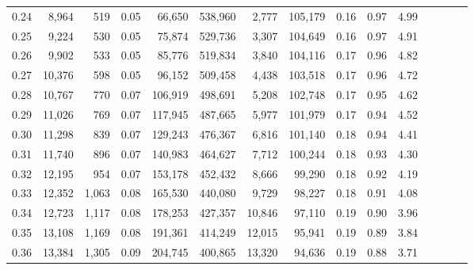\begin{tabular}{rrrcrrrrrrrrrrr}
0.24 &   8,964 &    519 &                                       0.05 &   66,650 &  538,960 &    2,777 &  105,179 &  0.16 &  0.97 &                         4.99 \\
0.25 &   9,224 &    530 &                                       0.05 &   75,874 &  529,736 &    3,307 &  104,649 &  0.16 &  0.97 &                         4.91 \\
0.26 &   9,902 &    533 &                                       0.05 &   85,776 &  519,834 &    3,840 &  104,116 &  0.17 &  0.96 &                         4.82 \\
0.27 &  10,376 &    598 &                                       0.05 &   96,152 &  509,458 &    4,438 &  103,518 &  0.17 &  0.96 &                         4.72 \\
0.28 &  10,767 &    770 &                                       0.07 &  106,919 &  498,691 &    5,208 &  102,748 &  0.17 &  0.95 &                         4.62 \\
0.29 &  11,026 &    769 &                                       0.07 &  117,945 &  487,665 &    5,977 &  101,979 &  0.17 &  0.94 &                         4.52 \\
0.30 &  11,298 &    839 &                                       0.07 &  129,243 &  476,367 &    6,816 &  101,140 &  0.18 &  0.94 &                         4.41 \\
0.31 &  11,740 &    896 &                                       0.07 &  140,983 &  464,627 &    7,712 &  100,244 &  0.18 &  0.93 &                         4.30 \\
0.32 &  12,195 &    954 &                                       0.07 &  153,178 &  452,432 &    8,666 &   99,290 &  0.18 &  0.92 &                         4.19 \\
0.33 &  12,352 &  1,063 &                                       0.08 &  165,530 &  440,080 &    9,729 &   98,227 &  0.18 &  0.91 &                         4.08 \\
0.34 &  12,723 &  1,117 &                                       0.08 &  178,253 &  427,357 &   10,846 &   97,110 &  0.19 &  0.90 &                         3.96 \\
0.35 &  13,108 &  1,169 &                                       0.08 &  191,361 &  414,249 &   12,015 &   95,941 &  0.19 &  0.89 &                         3.84 \\
0.36 &  13,384 &  1,305 &                                       0.09 &  204,745 &  400,865 &   13,320 &   94,636 &  0.19 &  0.88 &                         3.71 \\

\end{tabular}
